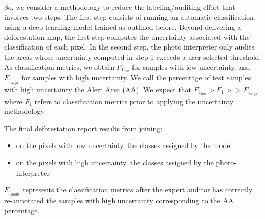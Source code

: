 So, we consider a methodology to reduce the labeling/auditing effort that involves two steps. 
The first step consists of running an automatic classification using a deep learning model trained as outlined before. Beyond delivering a deforestation map, the first step computes the uncertainty associated with the classification of each pixel. 
In the second step, the photo interpreter only audits the areas whose uncertainty computed in step 1 exceeds a user-selected threshold. As classification metrics, we obtain $F_{1_{low}}$ for samples with low uncertainty, and $F_{1_{high}}$ for samples with high uncertainty. We call the percentage of test samples with high uncertainty the Alert Area (AA). We expect that $F_{1_{low}}>F_1>>F_{1_{high}}$, where $F_1$ refers to classification metrics prior to applying the uncertainty methodology.

\bigskip
The final deforestation report results from joining:
\begin{itemize}
\item on the pixels with low uncertainty, the classes assigned by the model

\item on the pixels with high uncertainty, the classes assigned by the photo-interpreter 
\end{itemize}

\bigskip

$F_{1_{audit}}$ represents the classification metrics after the expert auditor has correctly re-annotated the samples with high uncertainty corresponding to the AA percentage.






